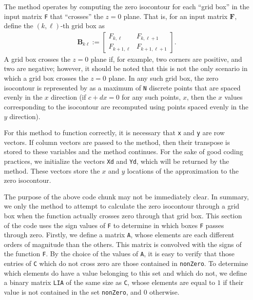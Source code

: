 \documentclass{article}
\begin{document}
The method operates by computing the zero isocontour
for each ``grid box'' in the input matrix \texttt{F} that
``crosses'' the $z=0$ plane. That is, for an input matrix
$\mathbf{F}$, define the $(k,\ell)$-th grid box as
\begin{align*}
  \mathbf{B}_{k\ell} := \left[
    \begin{array}{rr}
      F_{k, \ell} & F_{k, \ell+1}\\
      F_{k+1, \ell} & F_{k+1, \ell + 1}
    \end{array}
  \right].
\end{align*}
A grid box crosses the $z=0$ plane if, for example, two corners
are positive, and two are negative; however, it should be noted
that this is not the only scenario in which a grid box crosses the
$z=0$ plane.  In any such grid box, the zero isocontour is
represented by as a maximum of \texttt{N} discrete points that are
spaced evenly in the $x$ direction (if $c+dx = 0$ for any such
points, $x$, then the $x$ values corresponding to the isocontour
are recomputed using points spaced evenly in the $y$
direction). 



For this method to function correctly, it is necessary that \texttt{x}
and \texttt{y} are row vectors. If column vectors are passed to the
method, then their transpose is stored to these variables and the
method continues. For the sake of good coding practices, we
initialize the vectors \texttt{Xd} and \texttt{Yd}, which will
be returned by the method. These vectors store the $x$ and $y$
locations of the approximation to the zero isocontour. 



The purpose of the above code chunk may not be immediately
clear. In summary, we only the method to attempt to calculate the
zero isocontour through a grid box when the function actually
crosses zero through that grid box. This section of the code uses
the sign values of \texttt{F} to determine in which boxes
\texttt{F} passes through zero. Firstly, we define a matrix
\texttt{A}, whose elements are each different orders of magnitude
than the others. This matrix is convolved with the signs of the
function \texttt{F}. By the choice of the values of \texttt{A}, it
is easy to verify that those entries of \texttt{C} which do not
cross zero are those contained in \texttt{nonZero}. To determine
which elements do have a value belonging to this set and which do
not, we define a binary matrix \texttt{LIA} of the same size as
\texttt{C}, whose elements are equal to $1$ if their value is not
contained in the set \texttt{nonZero}, and $0$ otherwise.
\end{document}

